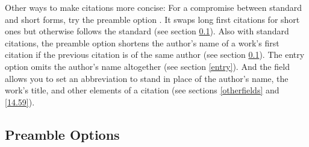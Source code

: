 \documentclass[11pt,letterpaper,oneside]{article}
\begin{document}
\begin{citeonly}
\item \cite[3]{morrison2004a}
\item \cite[18]{morrison2004a}
\item \cite[18]{morrison2004a}
\item \cite[24--26]{morrison2004a}
\item \cite[401-2]{morrison2004b}
\item \cite[433]{morrison2004b}
\item \cite[37--38]{diaz2008}
\item \cite[403]{morrison2004b}
\item \cite[152]{diaz2008}
\item \cite[201-2]{diaz2008}
\item \cites[240]{morrison2004b}[32]{morrison2004a}
\item \cite[33]{morrison2004a}
\end{citeonly}

Other ways to make citations more concise: For a compromise between
standard and short forms, try the  preamble option .
It swaps long first citations for short ones but otherwise follows the
standard (see section \ref{preamble}). Also with standard citations,
the preamble option  shortens the author's name of a
work's first citation if the previous citation is of the same author
(see section \ref{preamble}). The entry option  omits the
author's name altogether (see section \ref{entry}). And the
 field allows you to set an abbreviation to stand
in place of the author's name, the work's title, and other elements of
a citation (see sections \ref{otherfields} and \ref{14.59}).

\subsection{Preamble Options}
\label{preamble}
\end{document}
